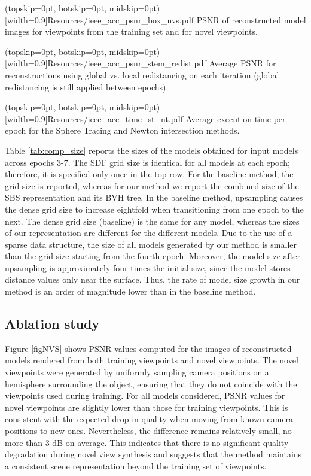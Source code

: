 \documentclass{ieeeaccess}
\begin{document}
\Figure[t](topskip=0pt, botskip=0pt, midskip=0pt)[width=0.9\textwidth]{Resources/ieee_acc_psnr_box_nvs.pdf} {
    PSNR of reconstructed model images for viewpoints from the training set and for novel viewpoints. \label{figNVS}
}

\Figure[h!](topskip=0pt, botskip=0pt, midskip=0pt)[width=0.9\textwidth]{Resources/ieee_acc_psnr_stem_redist.pdf} {
    Average PSNR for reconstructions using global vs. local redistancing on each iteration (global redistancing is still applied between epochs). \label{figPSNRRedist}
}

\Figure[t](topskip=0pt, botskip=0pt, midskip=0pt)[width=0.9\linewidth]{Resources/ieee_acc_time_st_nt.pdf}{
    Average execution time per epoch for the Sphere Tracing and Newton intersection methods.\label{figSTNt}
}

Table \ref{tab:comp_size} reports the sizes of the models obtained for input models across epochs 3-7. The SDF grid size is identical for all models at each epoch; therefore, it is specified only once in the top row. For the baseline method, the grid size is reported, whereas for our method we report the combined size of the SBS representation and its BVH tree. In the baseline method, upsampling causes the dense grid size to increase eightfold when transitioning from one epoch to the next. The dense grid size (baseline) is the same for any model, whereas the sizes of our representation are different for the different models. Due to the use of a sparse data structure, the size of all models generated by our method is smaller than the grid size starting from the fourth epoch. Moreover, the model size after upsampling is approximately four times the initial size, since the model stores distance values only near the surface. Thus, the rate of model size growth in our method is an order of magnitude lower than in the baseline method.

\subsection{Ablation study}

Figure \ref{figNVS} shows PSNR values computed for the images of reconstructed models rendered from both training viewpoints and novel viewpoints. The novel viewpoints were generated by uniformly sampling camera positions on a hemisphere surrounding the object, ensuring that they do not coincide with the viewpoints used during training. For all models considered, PSNR values for novel viewpoints are slightly lower than those for training viewpoints. This is consistent with the expected drop in quality when moving from known camera positions to new ones. Nevertheless, the difference remains relatively small, no more than 3 dB on average. This indicates that there is no significant quality degradation during novel view synthesis and suggests that the method maintains a consistent scene representation beyond the training set of viewpoints.
\end{document}
